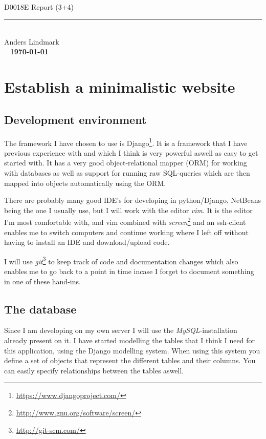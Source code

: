 \documentclass[12pt, a4paper,titlepage]{article}
\begin{document}
\ifpdf
{}
\else
{}
\fi

\begin{titlepage}
\ 
\begin{center}
\vfill
{\huge\sffamily D0018E Report (3+4)}
\rule{\linewidth}{0.3mm}\\
Anders Lindmark \\
\vfill
\ 
\vfill
{\textbf{\today}}
\end{center}
\end{titlepage}

\tableofcontents
\newpage

\section{Establish a minimalistic website}
\subsection{Development environment}
The framework I have chosen to use is
Django\footnote{\url{https://www.djangoproject.com/}}. 
It is a framework that I have previous experience with and which I think is
very powerful aswell as easy to get started with.
It has a very good object-relational mapper (ORM) for working with databases as well
as support for running raw SQL-queries which are then mapped into objects
automatically using the ORM.

There are probably many good IDE's for developing in python/Django, NetBeans
being the one I usually use, but I will work with the editor \emph{vim}. It is the 
editor I'm most comfortable with, and vim combined with
\emph{screen}\footnote{\url{http://www.gnu.org/software/screen/}} and an
ssh-client enables me to switch computers and continue working where I left
off without having to install an IDE and download/upload code.

I will use \emph{git}\footnote{\url{http://git-scm.com/}} to keep track of code
and documentation changes which also enables me to go back to a point in
time incase I forget to document something in one of these hand-ins.

\subsection{The database}
Since I am developing on my own server I will use the 
\emph{MySQL}-installation already present on it.
I have started modelling the tables that I think I need for this application, using
the Django modelling system. When using this system you define a set of 
objects that represent the different tables and their columns. You can easily
specify relationships between the tables aswell. 
\end{document}
